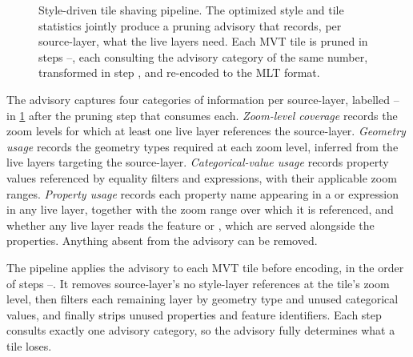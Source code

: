 \begin{figure}[htbp]
    \caption{
Style-driven tile shaving pipeline.
The optimized style and tile statistics jointly produce a pruning advisory that records, per source-layer, what the live layers need.
Each \acs{MVT} tile is pruned in steps --, each consulting the advisory category of the same number, transformed in step , and re-encoded to the \acs{MLT} format.}
    \label{fig:tile_shaving_pipeline}
\end{figure}

The advisory captures four categories of information per source-layer, labelled \mbox{--} in \cref{fig:tile_shaving_pipeline} after the pruning step that consumes each.
\emph{Zoom-level coverage} records the zoom levels for which at least one live layer references the source-layer.
\emph{Geometry usage} records the geometry types required at each zoom level, inferred from the live layers targeting the source-layer.
\emph{Categorical-value usage} records property values referenced by equality filters and  expressions, with their applicable zoom ranges.
\emph{Property usage} records each property name appearing in a  or  expression in any live layer, together with the zoom range over which it is referenced, and whether any live layer reads the feature  or , which are served alongside the properties.
Anything absent from the advisory can be removed.

The pipeline applies the advisory to each \ac{MVT} tile before encoding, in the order of steps --.
It removes source-layer's no style-layer references at the tile's zoom level, then filters each remaining layer by geometry type and unused categorical values, and finally strips unused properties and feature identifiers.
Each step consults exactly one advisory category, so the advisory fully determines what a tile loses.

